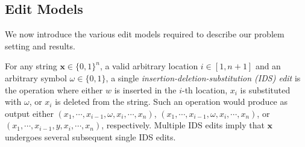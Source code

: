 \documentclass[onecolumn]{IEEEtran}
\newtheorem{example}{Example}
\newcommand{\bl}{n}
\newcommand{\insdel}{IDS\xspace}
\begin{document}
\subsection{Edit Models}
We now introduce the various edit models required to describe our problem setting and results.

For any string $\mathbf{x} \in \{0,1\}^\bl$, a valid arbitrary location $i\in[1, \bl+1]$ and an arbitrary symbol $\omega \in \{0,1\}$, a single \emph{insertion-deletion-substitution (\insdel) edit} is the operation where either $w$ is inserted in the $i$-th location, $x_i$ is substituted with $\omega$, or $x_i$ is deleted from the string. Such an operation would produce as output either $(x_1,\cdots,x_{i-1},\omega, x_{i}, \cdots, x_\bl)$, $(x_1,\cdots,x_{i-1},\omega, x_{i}, \cdots, x_\bl)$, or $(x_1,\cdots,x_{i-1},y, x_{i}, \cdots, x_\bl)$, respectively. Multiple \insdel edits imply that $\mathbf{x}$ undergoes several subsequent single \insdel edits.
\end{document}
